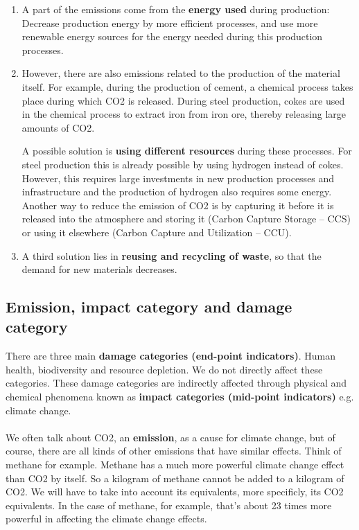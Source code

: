 \documentclass[../summary.tex]{subfiles}
\begin{document}
	\begin{enumerate}
		\item A part of the emissions come from the \textbf{energy used} during production: Decrease production energy by more efficient processes, and use more renewable energy sources for the energy needed during this production processes. 
		\item However, there are also emissions related to the production of the material itself. For example, during the production of cement, a chemical process takes place during which CO2 is released. During steel production, cokes are used in the chemical process to extract iron from iron ore, thereby releasing large amounts of CO2. 
		
		A possible solution is \textbf{using different resources} during these processes. For steel production this is already possible by using hydrogen instead of cokes. However, this requires large investments in new production processes and infrastructure and the production of hydrogen also requires some energy. Another way to reduce the emission of CO2 is by capturing it before it is released into the atmosphere and storing it (Carbon Capture Storage – CCS) or using it elsewhere (Carbon Capture and Utilization – CCU). 
		\item A third solution lies in \textbf{reusing and recycling of waste}, so that the demand for new materials decreases. 
	
	\end{enumerate}
	
	\subsection{Emission, impact category and damage category}
	
	There are three main \textbf{damage categories (end-point indicators)}. Human health, biodiversity and resource depletion. We do not directly affect these categories. These damage categories are indirectly affected through physical and chemical phenomena known as \textbf{impact categories (mid-point indicators)} e.g. climate change. \\
	\\
	We often talk about CO2, an \textbf{emission}, as a cause for climate change, but of course, there are all kinds of other emissions that have similar effects. Think of methane for example. Methane has a much more powerful climate change effect than CO2 by itself. So a kilogram of methane cannot be added to a kilogram of CO2. We will have to take into account its equivalents, more specificly, its CO2 equivalents. In the case of methane, for example, that's about 23 times more powerful in affecting the climate change effects. 
	
\end{document}
